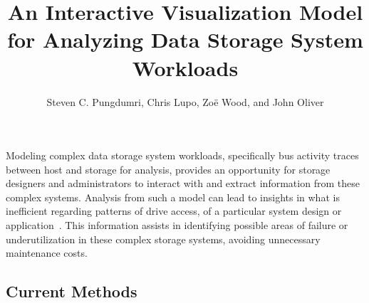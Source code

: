 \documentclass[journal]{vgtc}                %
\title{An Interactive Visualization Model for Analyzing Data Storage System Workloads}
\author{Steven C. Pungdumri, Chris Lupo, Zo\"{e} Wood, and John Oliver}
\begin{document}


\maketitle


Modeling complex data storage system workloads, specifically bus activity traces between host and storage for analysis, provides an opportunity for storage designers and administrators to interact with and extract information from these complex systems. Analysis from such a model can lead to insights in what is inefficient regarding patterns of drive access, of a particular system design or application~\cite{internal:understanding}. This information assists in identifying possible areas of failure or underutilization in these complex storage systems, avoiding unnecessary maintenance costs.

\subsection{Current Methods}
\label{current_methods}
\end{document}
